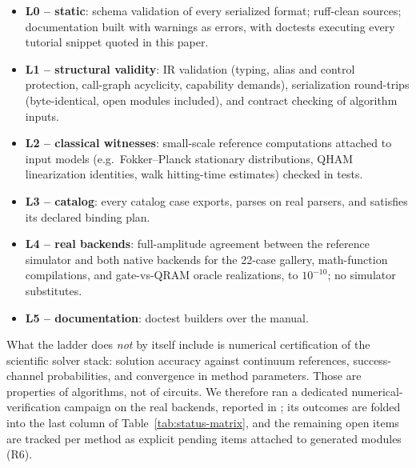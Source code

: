 \begin{itemize}
\item \textbf{L0 -- static}: schema validation of every serialized format;
  ruff-clean sources; documentation built with warnings as errors, with
  doctests executing every tutorial snippet quoted in this paper.
\item \textbf{L1 -- structural validity}: IR validation (typing, alias and
  control protection, call-graph acyclicity, capability demands),
  serialization round-trips (byte-identical, open modules included), and
  contract checking of algorithm inputs.
\item \textbf{L2 -- classical witnesses}: small-scale reference computations
  attached to input models (e.g.\ Fokker--Planck stationary distributions,
  QHAM linearization identities, walk hitting-time estimates) checked in
  tests.
\item \textbf{L3 -- catalog}: every catalog case exports, parses on real
  parsers, and satisfies its declared binding plan.
\item \textbf{L4 -- real backends}: full-amplitude agreement between the
  reference simulator and both native backends for the 22-case gallery,
  math-function compilations, and gate-vs-QRAM oracle realizations, to
  $10^{-10}$; no simulator substitutes.
\item \textbf{L5 -- documentation}: doctest builders over the manual.
\end{itemize}

What the ladder does \emph{not} by itself include is numerical certification
of the scientific solver stack: solution accuracy against continuum
references, success-channel probabilities, and convergence in method
parameters.  Those are properties of algorithms, not of circuits.  We
therefore ran a dedicated numerical-verification campaign on the real
backends, reported in ; its outcomes are folded into
the last column of Table~\ref{tab:status-matrix}, and the remaining
open items are tracked per method as explicit pending items attached to
generated modules (R6).

